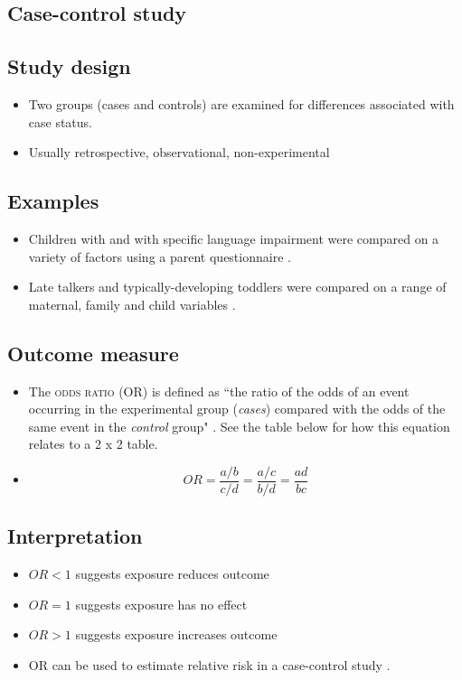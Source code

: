 \documentclass[a4paper]{article}
\begin{document}
\begin{center}
\section*{Case-control study}
\end{center}

\subsection*{Study design} 
\begin{itemize}
\item[] Two groups (cases and controls) are examined for differences associated with case status.
\item[] Usually retrospective, observational, non-experimental
\end{itemize}

\subsection*{Examples}
\begin{itemize}
\item[] Children with and with specific language impairment were compared on a variety of factors using a parent questionnaire \citep{Tomblin1997}.
\item[] Late talkers and typically-developing toddlers were compared on a range of maternal, family and child variables \citep{Zubrick2007}.
\end{itemize}

\subsection*{Outcome measure}
\begin{itemize}
\item[] The \textsc{odds ratio} (OR) is defined as ``the ratio of the odds of an event occurring in the experimental group (\emph{cases}) compared with the odds of the same event in the \emph{control} group" \citep[pp. 117--8]{Ajetunmobi2002}. See the table below for how this equation relates to a 2 x 2 table.
\item[] $$OR = \frac{a / b}{c/d} = \frac{a / c}{b / d} = \frac{ad}{bc}$$ 
\end{itemize}

\subsection*{Interpretation}
\begin{itemize}
\item[] $OR < 1$ suggests exposure reduces outcome
\item[] $OR = 1$ suggests exposure has no effect
\item[] $OR > 1$ suggests exposure increases outcome
\item[] OR can be used to estimate relative risk in a case-control study \citep[p. 241]{Bland2000}.
\end{itemize}
\end{document}
